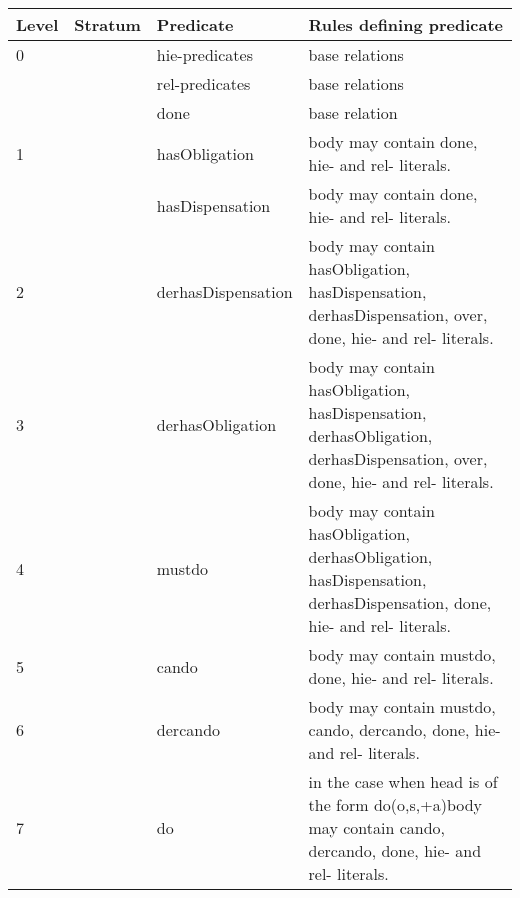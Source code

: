 \documentclass[12pt,journal,letterpaper,onecolumn]{IEEEtran}
\begin{document}
\begin{table}[h]
\begin{center}
\begin{minipage}[t]{6in}
\footnotesize
\begin{tabular}{|l|l|l|p{3.2in}|}
\hline

Level & Stratum & Predicate & Rules defining predicate \\

\hline

0 &  & hie-predicates & base relations \\
  &     & rel-predicates & base relations \\
  &     & done & base relation \\

\hline

1 &  & hasObligation & body may contain done, hie- and rel- literals. \\
  &        & hasDispensation & body may contain done, hie- and rel- literals. \\







\hline

2 &  & derhasDispensation & body may contain hasObligation,
hasDispensation, derhasDispensation, over, done,
hie- and rel- literals.\\
\hline

3 &  & derhasObligation & body may contain hasObligation,
hasDispensation,
derhasObligation, derhasDispensation, over, done, hie- and rel- literals.\\


\hline

4 &  & mustdo & body may contain hasObligation,
derhasObligation, hasDispensation, derhasDispensation, done,
hie- and rel- literals.\\

\hline

5 &  & cando & body may contain mustdo, done,
hie- and rel- literals.\\

\hline

6 &  & dercando & body may contain mustdo, cando, dercando,
 done, hie- and rel- literals.\\

\hline

7 &  & do & in the case when head is of the form do(o,s,+a)body
may contain cando, dercando, done,
hie- and rel- literals.\\
\hline


\end{tabular}
\end{minipage}
\end{center}
\end{table}
\end{document}
